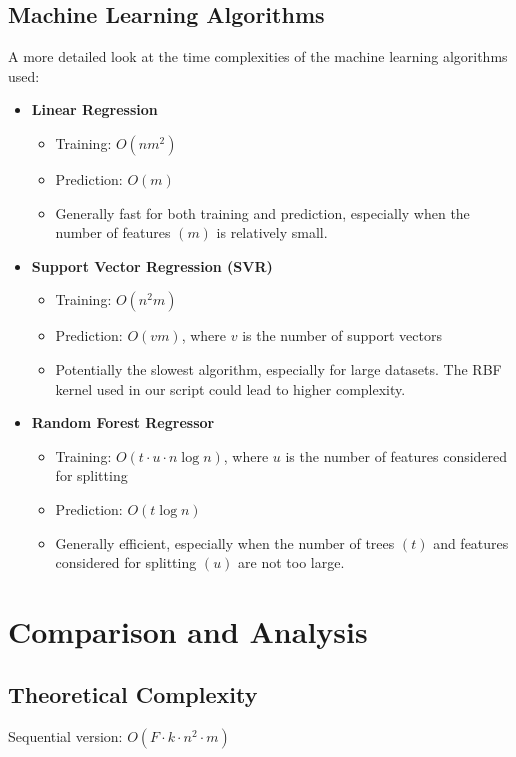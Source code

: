 \documentclass[11pt,a4paper]{article}
\begin{document}
\subsection{Machine Learning Algorithms}
A more detailed look at the time complexities of the machine learning algorithms used:

\begin{itemize}
    \item \textbf{Linear Regression}
    \begin{itemize}
        \item Training: $O(nm^2)$
        \item Prediction: $O(m)$
        \item Generally fast for both training and prediction, especially when the number of features $(m)$ is relatively small.
    \end{itemize}
    
    \item \textbf{Support Vector Regression (SVR)}
    \begin{itemize}
        \item Training: $O(n^2m)$
        \item Prediction: $O(vm)$, where $v$ is the number of support vectors
        \item Potentially the slowest algorithm, especially for large datasets. The RBF kernel used in our script could lead to higher complexity.
    \end{itemize}
    
    \item \textbf{Random Forest Regressor}
    \begin{itemize}
        \item Training: $O(t \cdot u \cdot n \log n)$, where $u$ is the number of features considered for splitting
        \item Prediction: $O(t \log n)$
        \item Generally efficient, especially when the number of trees $(t)$ and features considered for splitting $(u)$ are not too large.
    \end{itemize}
\end{itemize}

\section{Comparison and Analysis}

\subsection{Theoretical Complexity}
Sequential version: $O(F \cdot k \cdot n^2 \cdot m)$
\end{document}
